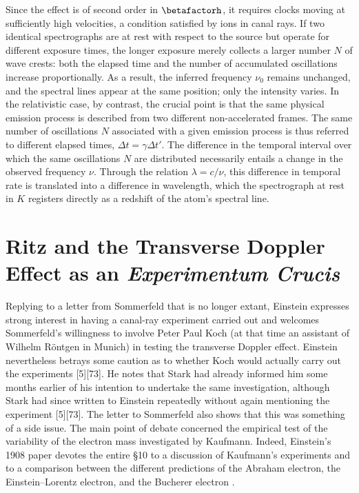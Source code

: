 \documentclass[submitted,12pt]{article}
\newcommand{\tDe}{transverse Doppler effect\xspace}
\begin{document}
Since the effect is of second order in $\betafactorh$, it requires clocks moving at sufficiently high velocities, a condition satisfied by ions in canal rays. If two identical spectrographs are at rest with respect to the source but operate for different exposure times, the longer exposure merely collects a larger number $N$ of wave crests: both the elapsed time and the number of accumulated oscillations increase proportionally. As a result, the inferred frequency $\nu_0$ remains unchanged, and the spectral lines appear at the same position; only the intensity varies. In the relativistic case, by contrast, the crucial point is that the same physical emission process is described from two different non-accelerated frames. The same number of oscillations $N$ associated with a given emission process is thus referred to different elapsed times, $\Delta t=\gamma \Delta t'$. The difference in the temporal interval over which the same oscillations $N$ are distributed necessarily entails a change in the observed frequency $\nu$. Through the relation $\lambda = c/\nu$, this difference in temporal rate is translated into a difference in wavelength, which the spectrograph at rest in $K$ registers directly as a redshift of the atom’s spectral line.


\section{Ritz and the Transverse Doppler Effect as an \emph{Experimentum Crucis}}
%
Replying to a letter from Sommerfeld that is no longer extant, Einstein expresses strong interest in having a canal-ray experiment carried out and welcomes Sommerfeld’s willingness to involve Peter Paul Koch (at that time an assistant of Wilhelm Röntgen in Munich) in testing the \tDe. Einstein nevertheless betrays some caution as to whether Koch would actually carry out the experiments [5][73]. He notes that Stark had already informed him some months earlier of his intention to undertake the same investigation, although Stark had since written to Einstein repeatedly without again mentioning the experiment [5][73]. The letter to Sommerfeld also shows that this was something of a side issue. The main point of debate concerned the empirical test of the variability of the electron mass investigated by Kaufmann. Indeed, Einstein’s 1908 paper devotes the entire \S10 to a discussion of Kaufmann’s experiments and to a comparison between the different predictions of the Abraham electron, the Einstein--Lorentz electron, and the Bucherer electron \citep{Walter2018}.
\end{document}
